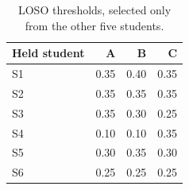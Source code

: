 \begin{table}[htbp]\centering\small
\caption{LOSO thresholds, selected only from the other five students.}\label{tab:losothresholds}
\begin{tabular}{@{}lrrr@{}}\toprule
Held student & A & B & C\\\midrule
S1 & 0.35 & 0.40 & 0.35\\
S2 & 0.35 & 0.35 & 0.35\\
S3 & 0.35 & 0.30 & 0.25\\
S4 & 0.10 & 0.10 & 0.35\\
S5 & 0.30 & 0.35 & 0.30\\
S6 & 0.25 & 0.25 & 0.25\\
\bottomrule\end{tabular}\end{table}
